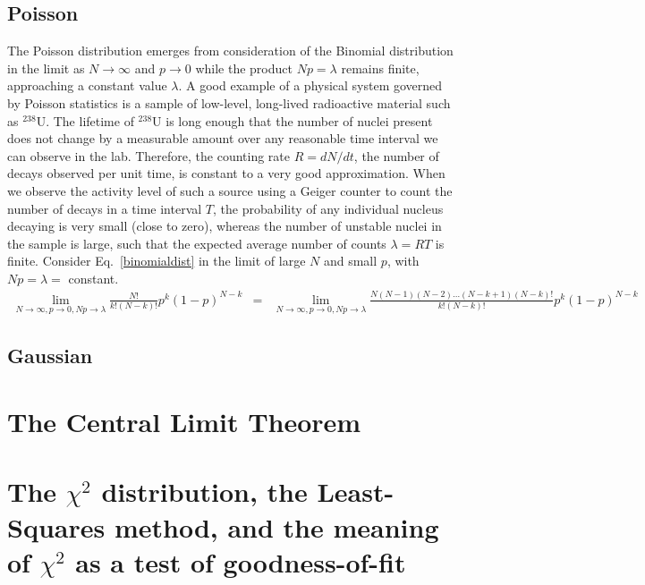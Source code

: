\documentclass{revtex4}
\begin{document}
\subsection{Poisson}
The Poisson distribution emerges from consideration of the Binomial
distribution in the limit as $N \rightarrow \infty$ and $p \rightarrow
0$ while the product $Np = \lambda$ remains finite, approaching a
constant value $\lambda$. A good example of a physical system governed
by Poisson statistics is a sample of low-level, long-lived radioactive
material such as $^{238}$U. The lifetime of $^{238}$U is long enough
that the number of nuclei present does not change by a measurable
amount over any reasonable time interval we can observe in the
lab. Therefore, the counting rate $R = dN/dt$, the number of decays
observed per unit time, is constant to a very good approximation.  When we observe the activity level of such
a source using a Geiger counter to count the number of decays in a
time interval $T$, the probability of any individual nucleus decaying
is very small (close to zero), whereas the number of unstable nuclei
in the sample is large, such that the expected average number of counts
$\lambda = RT$ is finite. Consider Eq.~\eqref{binomialdist} in the
limit of large $N$ and small $p$, with $Np = \lambda = $ constant. 
\begin{eqnarray}
  \lim_{N \rightarrow \infty, p \rightarrow 0, Np \rightarrow \lambda}
  \frac{N!}{k!(N-k)!} p^k (1-p)^{N-k} &=& \lim_{N \rightarrow \infty, p \rightarrow 0, Np \rightarrow \lambda} \frac{N(N-1)(N-2)\ldots (N-k+1)(N-k)!}{k!(N-k)!}p^k(1-p)^{N-k} 
\end{eqnarray}
\subsection{Gaussian}
\section{The Central Limit Theorem}
\section{The $\chi^2$ distribution, the Least-Squares method, and the
  meaning of $\chi^2$ as a test of goodness-of-fit}
\end{document}
